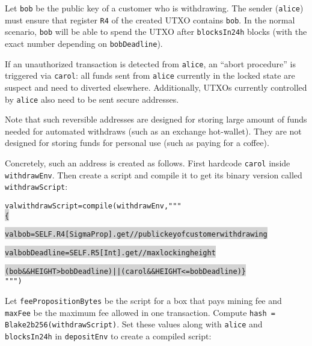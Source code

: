 \documentclass[11pt]{article}
\newcommand\Hi[2][lightgray]{%
	\hspace*{-\fboxsep}%
	\colorbox{#1}{#2}%
	\hspace*{-\fboxsep}%
}
\begin{document}
Let \texttt{bob} be the public key of a customer who is withdrawing. The sender (\texttt{alice}) must ensure that register \texttt{R4} of the created UTXO contains \texttt{bob}. In the normal scenario, \texttt{bob} will be able to spend the UTXO after \texttt{blocksIn24h} blocks (with the exact number depending on \texttt{bobDeadline}). 

If an unauthorized transaction is detected from \texttt{alice}, an ``abort procedure'' is triggered via \texttt{carol}: all funds sent from \texttt{alice} currently in the locked state are suspect and need to diverted elsewhere. Additionally, UTXOs currently controlled by \texttt{alice} also need to be sent secure addresses. 

Note that such reversible addresses are designed for storing large amount of funds needed for automated withdraws (such as an exchange hot-wallet). They are not designed for storing funds for personal use (such as paying for a coffee). 

Concretely, such an address is created as follows. First hardcode \texttt{carol} inside \texttt{withdrawEnv}. Then create a script and compile it to get its binary version called \texttt{withdrawScript}:
\begin{alltt}
val withdrawScript = compile(withdrawEnv, """ \Hi{\{}
  \Hi{val bob         = SELF.R4[SigmaProp].get // public key of customer withdrawing}
  \Hi{val bobDeadline = SELF.R5[Int].get       // max locking height}
  \Hi{(bob && HEIGHT > bobDeadline) || (carol && HEIGHT <= bobDeadline) \}} """)
\end{alltt}

Let \texttt{feePropositionBytes} be the script for a box that pays mining fee and \texttt{maxFee} be the maximum fee allowed in one transaction. 
Compute \texttt{hash = Blake2b256(withdrawScript)}. Set these values along with \texttt{alice} and \texttt{blocksIn24h} in \texttt{depositEnv} to create a compiled script: %

%
%
%
%
\end{document}
